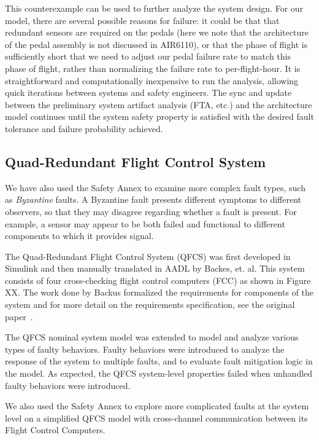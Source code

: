 This counterexample can be used to further analyze the system design.  For our model, there are several possible reasons for failure: it could be that that redundant sensors are required on the pedals (here we note that the architecture of the pedal assembly is not discussed in AIR6110), or that the phase of flight is sufficiently short that we need to adjust our pedal failure rate to match this phase of flight, rather than normalizing the failure rate to per-flight-hour.  It is straightforward and computationally inexpensive to run the analysis, allowing quick iterations between systems and safety engineers. The sync and update between the preliminary system artifact analysis (FTA, etc.) and the architecture model continues until the system safety property is satisfied with the desired fault tolerance and failure probability achieved.

\subsection{Quad-Redundant Flight Control System}
\label{subsec:qrfc_case_study}
We have also used the Safety Annex to examine more complex fault types, such as {\em Byzantine} faults.  A Byzantine fault presents different symptoms to different observers, so that they may disagree regarding whether a fault is present. For example, a sensor may appear to be both failed and functional to different components to which it provides signal. 

The Quad-Redundant Flight Control System (QFCS) was first developed in Simulink and then manually translated in AADL by Backes, et. al. This system consists of four cross-checking flight control computers (FCC) as shown in Figure XX. The work done by Backus formalized the requirements for components of the system and for more detail on the requirements specification, see the original paper~\cite{QFCS15:backes}. 

The QFCS nominal system model was extended to model and analyze various types of faulty behaviors. Faulty behaviors were introduced to analyze the response of the system to multiple faults, and to evaluate fault mitigation logic in the model. As expected, the QFCS system-level properties failed when unhandled faulty behaviors were introduced.

We also used the Safety Annex to explore more complicated faults at the system level on a simplified QFCS model with cross-channel communication between its Flight Control Computers.

